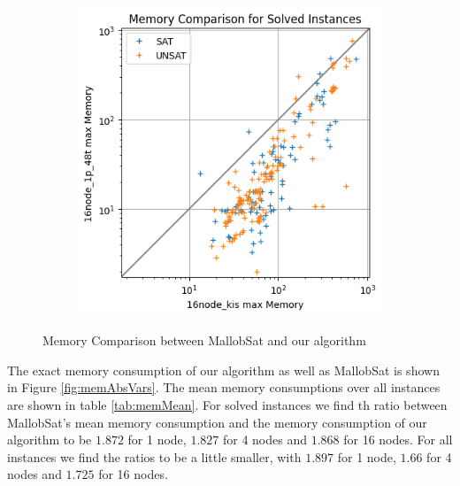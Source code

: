 \documentclass[12pt,a4paper,twoside]{scrartcl}
\numberwithin{equation}{section}
\begin{document}
\begin{figure}
\begin{subfigure}[c]{.4\textwidth}
    \label{fig:memCompare4node}
  \end{subfigure}
  \begin{subfigure}[c]{.4\textwidth}
    \center
    \includegraphics[scale=.5]{plots/square_mem_compare/square_mem_16node.png}
    \label{fig:memCompare16node}
  \end{subfigure}
  \caption{Memory Comparison between MallobSat and our algorithm}
  \label{fig:memCompare}
\end{figure}

The exact memory consumption of our algorithm as well as MallobSat is shown in Figure \ref{fig:memAbsVars}. The mean memory consumptions over all instances are shown in table \ref{tab:memMean}. For solved instances we find th ratio between MallobSat's mean memory consumption and the memory consumption of our algorithm to be $1.872$ for 1 node, $1.827$ for 4 nodes and $1.868$ for 16 nodes. For all instances we find the ratios to be a little smaller, with $1.897$ for 1 node, $1.66$ for 4 nodes and $1.725$ for 16 nodes.
\end{document}
